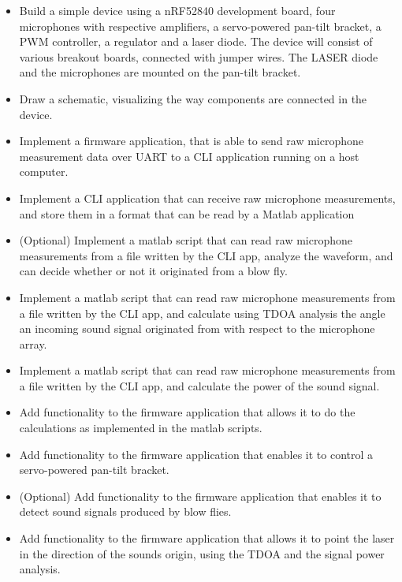 \documentclass[a4paper]{article}
\begin{document}
\begin{itemize}
    \item Build a simple device using a nRF52840 development board, four microphones with respective amplifiers, a servo-powered pan-tilt bracket, a PWM controller, a regulator and a laser diode. The device will consist of various breakout boards, connected with jumper wires. The LASER diode and the microphones are mounted on the pan-tilt bracket.
    \item Draw a schematic, visualizing the way components are connected in the device.
    \item Implement a firmware application, that is able to send raw microphone measurement data over UART to a CLI application running on a host computer.
    \item Implement a CLI application that can receive raw microphone measurements, and store them in a format that can be read by a Matlab application
    \item (Optional) Implement a matlab script that can read raw microphone measurements from a file written by the CLI app, analyze the waveform, and can decide whether or not it originated from a blow fly.
    \item Implement a matlab script that can read raw microphone measurements from a file written by the CLI app, and calculate using TDOA analysis the angle an incoming sound signal originated from with respect to the microphone array.
    \item Implement a matlab script that can read raw microphone measurements from a file written by the CLI app, and calculate the power of the sound signal.
    \item Add functionality to the firmware application that allows it to do the calculations as implemented in the matlab scripts.
    \item Add functionality to the firmware application that enables it to control a servo-powered pan-tilt bracket.
    \item (Optional) Add functionality to the firmware application that enables it to detect sound signals produced by blow flies.
    \item Add functionality to the firmware application that allows it to point the laser in the direction of the sounds origin, using the TDOA and the signal power analysis.
\end{itemize}
\end{document}
